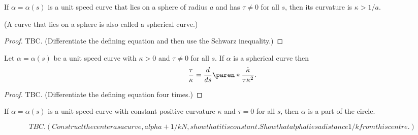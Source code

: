 \documentclass[11pt]{penrose}
\begin{document}
\begin{nthm}
    If $\alpha = \alpha(s)$ is a unit speed curve that lies on a sphere of radius $a$ and has $\tau \neq 0$ for all $s$, then its curvature is $\kappa > 1/a$.

    (A curve that lies on a sphere is also called a spherical curve.)
\end{nthm}
\begin{proof}
    TBC. (Differentiate the defining equation and then use the Schwarz inequality.)
\end{proof}

\begin{nthm}
    Let $\alpha = \alpha(s)$ be a unit speed curve with $\kappa > 0$ and $\tau \neq 0$ for all $s$. If $\alpha$ is a spherical curve then
    \begin{equation}
        \frac{\tau}{\kappa} = \frac{d}{ds}\paren*{\frac{\dot{\kappa}}{\tau \kappa^2}}.
    \end{equation}
\end{nthm}
\begin{proof}
    TBC. (Differentiate the defining equation four times.)
\end{proof}

\begin{nthm}
    If $\alpha = \alpha(s)$ is a unit speed curve with constant positive curvature $\kappa$ and $\tau = 0$ for all $s$, then $\alpha$ is a part of the circle.
\end{nthm}
\begin{equation}
    TBC. (Construct the center as a curve, alpha + 1/k N, show that it is constant. Show that alpha lies a distance 1/k from this centre.)
\end{equation}
\end{document}
